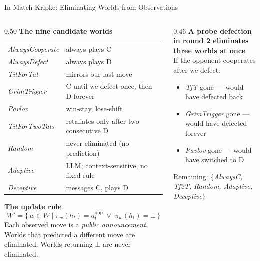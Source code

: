 \documentclass[aspectratio=169, 10pt]{beamer}
\begin{document}
\begin{frame}{In-Match Kripke: Eliminating Worlds from Observations}

    \begin{columns}[T]
        \begin{column}{0.50\textwidth}
            \textbf{The nine candidate worlds}\\[6pt]
            \begin{tabular}{ll}
                \textit{AlwaysCooperate} & always plays C \\
                \textit{AlwaysDefect}    & always plays D \\
                \textit{TitForTat}       & mirrors our last move \\
                \textit{GrimTrigger}     & C until we defect once, then D forever \\
                \textit{Pavlov}          & win-stay, lose-shift \\
                \textit{TitForTwoTats}   & retaliates only after two consecutive D \\
                \textit{Random}          & never eliminated (no prediction) \\
                \textcolor{orange1}{\textit{Adaptive}}   & \textcolor{orange1}{LLM; context-sensitive, no fixed rule} \\
                \textcolor{red1}{\textit{Deceptive}} & \textcolor{red1}{messages C, plays D} \\
            \end{tabular}

            \vspace{0.4cm}
            \textbf{The update rule}
            \[
              W' = \{\, w \in W \mid \pi_w(h_t) = a_t^{\text{opp}} \;\vee\; \pi_w(h_t) = \bot \,\}
            \]
            Each observed move is a \emph{public announcement}. Worlds that predicted
            a different move are eliminated. Worlds returning $\bot$ are never eliminated.
        \end{column}
        \begin{column}{0.46\textwidth}
            \textbf{A probe defection in round 2 eliminates three worlds at once}\\[6pt]
            If the opponent cooperates after we defect:\\[4pt]
            \begin{itemize}
                \item \textit{TfT} gone --- would have defected back
                \item \textit{GrimTrigger} gone --- would have defected forever
                \item \textit{Pavlov} gone --- would have switched to D
            \end{itemize}
            \vspace{0.2cm}
            Remaining: $\{$\textit{AlwaysC, Tf2T, Random, Adaptive, Deceptive}$\}$


\end{column}
\end{columns}
\end{frame}
\end{document}
